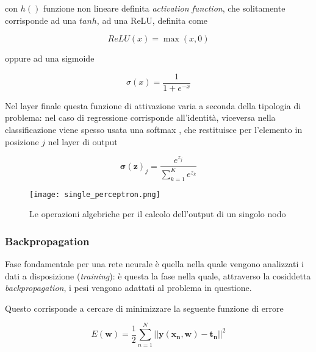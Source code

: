 con $h()$ funzione non lineare definita \textit{activation function}, che solitamente corrisponde ad una $tanh$, ad una 
ReLU, definita come \cite{Nwankpa2018}

\begin{equation}
    ReLU(x) = \max (x, 0)
    \label{eq:relu}
\end{equation}

\noindent
oppure ad una sigmoide \cite{Nwankpa2018}

\begin{equation}
    \sigma(x) = \frac{1}{1+e^{-x}}
    \label{eq:sigmoid}
\end{equation}


Nel layer finale questa funzione di attivazione varia a seconda della tipologia di problema: nel caso di regressione 
corrisponde all'identità, 
viceversa nella classificazione viene spesso usata una softmax \cite{Keck2014}, che restituisce per 
l'elemento in posizione $j$ nel layer di output 

\begin{equation}
    \mathbf{\sigma(z)}_j = \frac{e^{z_j}}{\sum_{k=1}^{K}e^{z_k}}
    \label{eq:softmax}
\end{equation}

\begin{figure}[h]
    \begin{small}
        \begin{center}
            \texttt{[image: single\_perceptron.png]}
        \end{center}
        \caption{Le operazioni algebriche per il calcolo dell'output di un singolo nodo}
        \label{fig:}
    \end{small}
\end{figure}

\subsubsection{Backpropagation} 

Fase fondamentale per una rete neurale è quella nella quale vengono analizzati i dati a disposizione 
(\textit{training}): è questa la fase nella quale, attraverso la cosiddetta \textit{backpropagation}, 
i pesi vengono adattati al problema in questione.

Questo corrisponde a cercare di minimizzare la seguente funzione di errore \cite{bishop2006pattern}

\begin{equation}
    E(\mathbf{w}) = \frac{1}{2} \sum_{n=1}^{N} || \mathbf{y(x_n, w) - t_n} || ^2
    \label{eq:error_nn}
\end{equation}

